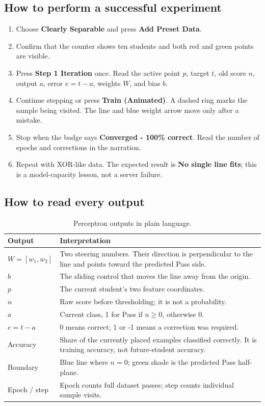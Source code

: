 \documentclass[12pt,a4paper,openany]{report}
\begin{document}
\subsection{How to perform a successful experiment}
\begin{enumerate}
\item Choose \textbf{Clearly Separable} and press \textbf{Add Preset Data}.
\item Confirm that the counter shows ten students and both red and green points
are visible.
\item Press \textbf{Step 1 Iteration} once. Read the active point $p$, target
$t$, old score $n$, output $a$, error $e=t-a$, weights $W$, and bias $b$.
\item Continue stepping or press \textbf{Train (Animated)}. A dashed ring marks
the sample being visited. The line and blue weight arrow move only after a
mistake.
\item Stop when the badge says \textbf{Converged - 100\% correct}. Read the
number of epochs and corrections in the narration.
\item Repeat with XOR-like data. The expected result is \textbf{No single line
fits}; this is a model-capacity lesson, not a server failure.
\end{enumerate}

\subsection{How to read every output}
\begin{table}[H]
\centering\small
\caption{Perceptron outputs in plain language.}
\begin{tabularx}{\textwidth}{p{}Y}
\toprule
\textbf{Output} & \textbf{Interpretation} \\
\midrule
$W=[w_1,w_2]$ & Two steering numbers. Their direction is perpendicular to the line and points toward the predicted Pass side. \\
$b$ & The sliding control that moves the line away from the origin. \\
$p$ & The current student's two feature coordinates. \\
$n$ & Raw score before thresholding; it is not a probability. \\
$a$ & Current class, 1 for Pass if $n\ge0$, otherwise 0. \\
$e=t-a$ & 0 means correct; 1 or -1 means a correction was required. \\
Accuracy & Share of the currently placed examples classified correctly. It is training accuracy, not future-student accuracy. \\
Boundary & Blue line where $n=0$; green shade is the predicted Pass half-plane. \\
Epoch / step & Epoch counts full dataset passes; step counts individual sample visits. \\
\bottomrule
\end{tabularx}
\end{table}
\end{document}
